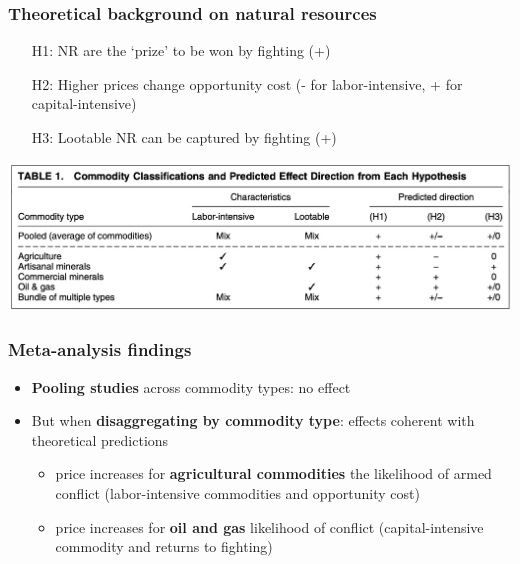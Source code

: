 \documentclass[aspectratio=43]{beamer}
\begin{document}
\begin{frame}
\frametitle{Theoretical background on natural resources}
\centering

\begin{itemize}
  \item[H1:] NR are the `prize' to be won by fighting (+)
  \item[H2:] Higher prices change opportunity cost (- for labor-intensive, + for capital-intensive)
  \item[H3:] Lootable NR can be captured by fighting (+)
\end{itemize}

\includegraphics[width = \textwidth]{../img/blair_apsr2}

\end{frame}

\begin{frame}
\frametitle{Meta-analysis findings}
\centering

\begin{itemize}
  \item \textbf{Pooling studies} across commodity types: no effect
  \item<2-> But when \textbf{disaggregating by commodity type}: effects coherent with theoretical predictions
  \begin{itemize}
    \item<3-> price increases for \textbf{agricultural commodities}  the likelihood of armed conflict (labor-intensive commodities and opportunity cost)
    \item<4-> price increases for \textbf{oil and gas}  likelihood of conflict (capital-intensive commodity and returns to fighting)
  \end{itemize}
\end{itemize}

\end{frame}
\end{document}
